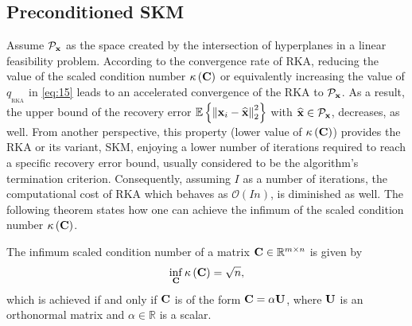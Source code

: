 \documentclass[12pt,draftcls,onecolumn]{IEEEtran}
\begin{document}
\subsection{Preconditioned SKM}
\label{sec_preSKM}
Assume $\mathcal{P}_{\mathbf{x}}$ as the space created by the intersection of hyperplanes in a linear feasibility problem. According to the convergence rate of RKA, reducing the value of the scaled condition number $\kappa\left(\mathbf{C}\right)$ or equivalently increasing the value of $q_{_{\text{RKA}}}$ in \eqref{eq:15} leads to an accelerated convergence of the RKA to $\mathcal{P}_{\mathbf{x}}$. As a result, the upper bound of the recovery error $\mathbb{E}\left\{\left\|\mathbf{x}_{i}-\widehat{\mathbf{x}}\right\|_{2}^{2}\right\}$ with $\widehat{\mathbf{x}} \in \mathcal{P}_{\mathbf{x}}$, decreases, as well.
From another perspective, this property (lower value of $\kappa\left(\mathbf{C}\right)$) provides the RKA or its variant, SKM, enjoying a lower number of iterations required to reach a specific recovery error bound, usually considered to be the algorithm's termination criterion. Consequently, assuming $I$ as a number of iterations, the computational cost of RKA which behaves as $\mathcal{O}\left(I n\right)$, is diminished as well. %
The following theorem states how one can achieve the infimum of the scaled condition number $\kappa\left(\mathbf{C}\right)$.
\begin{theorem}
\label{scaled_number}
The infimum scaled condition number of a matrix $\mathbf{C}\in\mathbb{R}^{m\times n}$ is given by
\begin{equation}
\label{eq:Arian}
\inf_{\mbC} \kappa\left(\mbC\right) = \sqrt{n},
\end{equation}
which is achieved if and only if $\mathbf{C}$ is of the form $\mathbf{C}=\alpha \mathbf{U}$, where $\mathbf{U}$ is an orthonormal matrix and $\alpha\in\mathbb{R}$ is a scalar.
\end{theorem}
\end{document}
